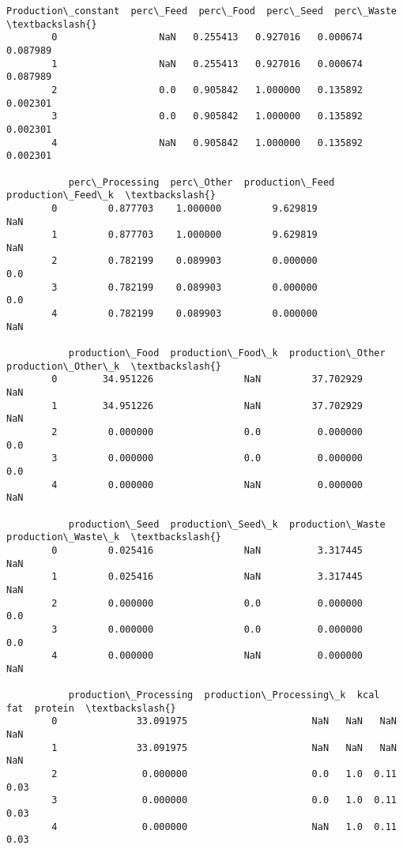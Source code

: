 \documentclass[11pt]{article}
\begin{document}
\begin{Verbatim}[commandchars=\\\{\}]
           Production\_constant  perc\_Feed  perc\_Food  perc\_Seed  perc\_Waste  \textbackslash{}
        0                  NaN   0.255413   0.927016   0.000674    0.087989   
        1                  NaN   0.255413   0.927016   0.000674    0.087989   
        2                  0.0   0.905842   1.000000   0.135892    0.002301   
        3                  0.0   0.905842   1.000000   0.135892    0.002301   
        4                  NaN   0.905842   1.000000   0.135892    0.002301   
        
           perc\_Processing  perc\_Other  production\_Feed  production\_Feed\_k  \textbackslash{}
        0         0.877703    1.000000         9.629819                NaN   
        1         0.877703    1.000000         9.629819                NaN   
        2         0.782199    0.089903         0.000000                0.0   
        3         0.782199    0.089903         0.000000                0.0   
        4         0.782199    0.089903         0.000000                NaN   
        
           production\_Food  production\_Food\_k  production\_Other  production\_Other\_k  \textbackslash{}
        0        34.951226                NaN         37.702929                 NaN   
        1        34.951226                NaN         37.702929                 NaN   
        2         0.000000                0.0          0.000000                 0.0   
        3         0.000000                0.0          0.000000                 0.0   
        4         0.000000                NaN          0.000000                 NaN   
        
           production\_Seed  production\_Seed\_k  production\_Waste  production\_Waste\_k  \textbackslash{}
        0         0.025416                NaN          3.317445                 NaN   
        1         0.025416                NaN          3.317445                 NaN   
        2         0.000000                0.0          0.000000                 0.0   
        3         0.000000                0.0          0.000000                 0.0   
        4         0.000000                NaN          0.000000                 NaN   
        
           production\_Processing  production\_Processing\_k  kcal   fat  protein  \textbackslash{}
        0              33.091975                      NaN   NaN   NaN      NaN   
        1              33.091975                      NaN   NaN   NaN      NaN   
        2               0.000000                      0.0   1.0  0.11     0.03   
        3               0.000000                      0.0   1.0  0.11     0.03   
        4               0.000000                      NaN   1.0  0.11     0.03   
        

\end{Verbatim}
\end{document}
